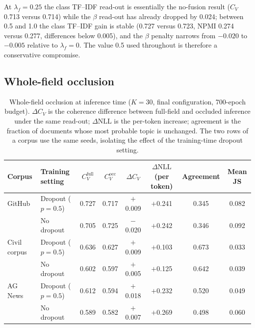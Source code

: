 \documentclass[11pt]{article}
\begin{document}
At $\lambda_f=0.25$ the class TF--IDF read-out is essentially the no-fusion result ($C_V$ 0.713
versus 0.714) while the $\beta$ read-out has already dropped by 0.024; between 0.5 and 1.0 the
class TF--IDF gain is stable (0.727 versus 0.723, NPMI 0.274 versus 0.277, differences below
0.005), and the $\beta$ penalty narrows from $-0.020$ to $-0.005$ relative to $\lambda_f=0$.
The value 0.5 used throughout is therefore a conservative compromise.

\subsection{Whole-field occlusion}

\begin{table}[t]
\centering
\caption{Whole-field occlusion at inference time ($K=30$, final configuration, 700-epoch budget). $\Delta C_V$ is the coherence difference between full-field and occluded inference under the same read-out; $\Delta\mathrm{NLL}$ is the per-token increase; agreement is the fraction of documents whose most probable topic is unchanged. The two rows of a corpus use the same seeds, isolating the effect of the training-time dropout setting.}
\label{tab:occlusion}
\small
\setlength{\tabcolsep}{4pt}
\begin{tabular}{llcccccc}
\toprule
Corpus & Training setting & $C_V^{\mathrm{full}}$ & $C_V^{\mathrm{occ}}$ & $\Delta C_V$
 & $\Delta\mathrm{NLL}$(per token) & Agreement & Mean JS \\
\midrule
GitHub & Dropout ($p=0.5$) & 0.727 & 0.717 & $+$0.009 & $+$0.241 & 0.345 & 0.082 \\
       & No dropout & 0.705 & 0.725 & $-$0.020 & $+$0.242 & 0.346 & 0.092 \\
\midrule
Civil corpus & Dropout ($p=0.5$) & 0.636 & 0.627 & $+$0.009 & $+$0.103 & 0.673 & 0.033 \\
        & No dropout & 0.602 & 0.597 & $+$0.005 & $+$0.125 & 0.642 & 0.039 \\
\midrule
AG News & Dropout ($p=0.5$) & 0.612 & 0.594 & $+$0.018 & $+$0.232 & 0.520 & 0.049 \\
        & No dropout & 0.589 & 0.582 & $+$0.007 & $+$0.269 & 0.498 & 0.060 \\
\bottomrule
\end{tabular}
\end{table}
\end{document}
